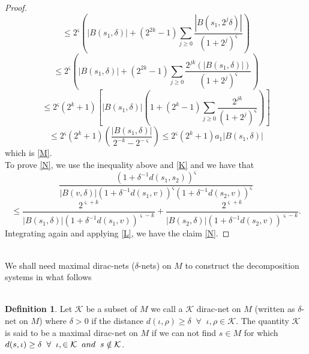 \documentclass[10pt]{article}
\theoremstyle{definition}
\newtheorem{defx}[thm]{Definition}
\numberwithin{equation}{section}
\begin{document}
\begin{proof}
\begin{equation*}
			\leq 2^{\varsigma}\left(|B(s_1,\delta)|+(2^{2k}-1)\sum_{j\geq 0}\frac{|B(s_1,2^j \delta)|}{(1+2^j)^{\varsigma}}\right)
		\end{equation*}
		\begin{equation*}
			\leq 2^{\varsigma}\left(|B(s_1,\delta)|+(2^{2k}-1)\sum_{j\geq 0}\frac{2^{jk}(|B(s_1,\delta)|)}{(1+2^j)^{\varsigma}}\right)
		\end{equation*}
		\begin{equation*}
			\leq 2^{\varsigma}(2^k +1)\left[|B(s_1,\delta)|\left(1+(2^{k}-1)\sum_{j\geq 0}\frac{2^{jk}}{(1+2^j)^{\varsigma}}\right)\right]
		\end{equation*}
		\begin{equation*}
			\leq 2^{\varsigma}(2^k +1)\left(\frac{|B(s_1,\delta)|}{2^{-k}-2^{-\varsigma}}\right)
			\leq 2^{\varsigma}(2^k+1)a_1|B(s_1,\delta)|
		\end{equation*}
		which is \eqref{M}.\\
		To prove \eqref{N}, we use the inequality above and \eqref{K} and we have that
		\begin{equation*}
			\frac{(1+\delta^{-1} d(s_1,s_2))^{\varsigma}}{|B(v,\delta)|(1+\delta^{-1} d(s_1,v))^{\varsigma} (1+\delta^{-1} d(s_2,v))^{\varsigma}}
		\end{equation*}
		\begin{equation}
			\leq \frac{2^{\varsigma +k}}{|B(s_1,\delta)|(1+\delta^{-1} d(s_1,v))^{\varsigma -k}} + \frac{2^{\varsigma +k}}{|B(s_2,\delta)|(1+\delta^{-1} d(s_2,v))^{\varsigma -k}}.
		\end{equation}
		Integrating again and applying \eqref{L}, we have the claim \eqref{N}.
	\end{proof}
	\ \\
	We shall need maximal dirac-nets ($\delta$-nets) on $M$ to construct the decomposition systems in what follows\\
	\\
	\begin{defx}
 Let $\mathcal{K}$ be a subset of $M$ we call a $\mathcal{K}$ dirac-net on $M$ (written as $\delta$-net on $M$) where $\delta>0$ if the distance $d(\iota, \rho) \geq \delta \; \; \forall \; \; \iota, \rho \in \mathcal{K} $. The quantity $\mathcal{K}$ is said to be a maximal dirac-net on $M$ if we can not find $s \in M$ for which $d(s,\iota) \geq \delta \hspace{0.2 cm} \forall \hspace{0.2 cm} \iota,\in \mathcal{K} \hspace{0.2 cm} and \hspace{0.2 cm} s \notin \mathcal{K}$.
	\end{defx}
\end{document}
